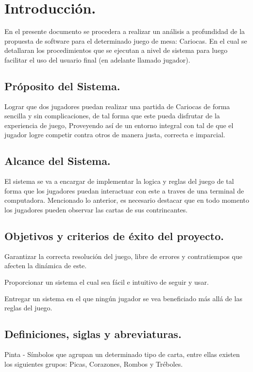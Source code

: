\documentclass[60pt]{article}
\begin{document}
\newpage



\section{Introducción.}\label{cap:intro}

En el presente documento se procedera a realizar un análisis a profundidad de la propuesta de software para el determinado juego de mesa: Cariocas. En el cual se detallaran los procedimientos que se ejecutan a nivel de sistema para luego facilitar el uso del usuario final (en adelante llamado jugador).



\subsection{Próposito del Sistema.}\label{cap:proposito}
Lograr que dos jugadores puedan realizar una partida de Cariocas de forma sencilla y sin complicaciones, de tal forma que este pueda disfrutar de la experiencia de juego,
Proveyendo así de un entorno integral con tal de que el jugador logre competir contra otros de manera justa, correcta
e imparcial.

\subsection{Alcance del Sistema.}\label{cap:alcance}
El sistema se va a encargar de implementar la logica y reglas del juego de tal forma que los jugadores puedan interactuar con este a traves de una terminal de computadora. Mencionado lo anterior, es necesario destacar que en todo momento los jugadores pueden observar las cartas de sus contrincantes.

\subsection{Objetivos y criterios de éxito del proyecto.}\label{cap:objetivos}
Garantizar la correcta resolución del juego, libre de errores y contratiempos que afecten la dinámica de este.

Proporcionar un sistema el cual sea fácil e intuitivo de seguir y usar.

Entregar un sistema en el que ningún jugador se vea beneficiado más allá de las reglas del juego.
\subsection{Definiciones, siglas y abreviaturas.}\label{cap:definiciones}
Pinta - Símbolos que agrupan un determinado tipo de carta, entre ellas existen los siguientes grupos: Picas, Corazones, Rombos y Tréboles.
\end{document}
